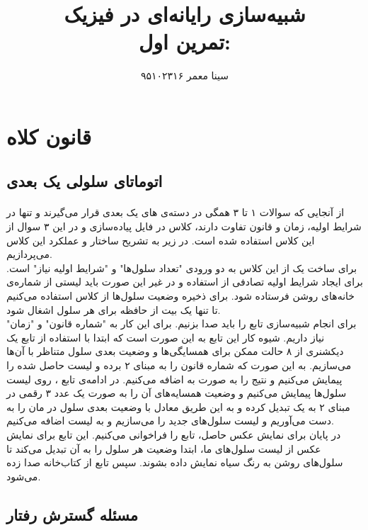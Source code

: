 \documentclass[11pt, a4paper]{article}
\title{\textbf{شبیه‌سازی رایانه‌ای در فیزیک}
    \\تمرین اول: \lr{Cellular Automata}}
\author{سینا معمر ۹۵۱۰۲۳۱۶}
\begin{document}
\maketitle
\thispagestyle{empty}


\section{\textbf{قانون کلاه}}
\subsection{اتوماتای سلولی یک بعدی}
\paragraph{}
از آنجایی که سوالات ۱ تا ۳ همگی در دسته‌ی  های یک بعدی قرار می‌گیرند و تنها در شرایط اولیه، زمان و قانون تفاوت دارند، کلاس  در فایل  پیاده‌سازی و در این ۳ سوال از این کلاس استفاده شده است. در زیر به تشریح ساختار و عملکرد این کلاس می‌پردازیم.\\
برای ساخت یک  از این کلاس به دو ورودی "تعداد سلول‌ها" و "شرایط اولیه نیاز" است. برای ایجاد شرایط اولیه تصادفی از  استفاده و در غیر این صورت باید لیستی از شماره‌ی خانه‌های روشن فرستاده شود. برای ذخیره وضعیت سلول‌ها از کلاس  استفاده می‌کنیم تا تنها یک بیت از حافظه برای هر سلول اشغال شود.\\
برای انجام شبیه‌سازی تابع  را باید صدا بزنیم. برای این کار به "شماره قانون" و "زمان" نیاز داریم. شیوه کار این تابع به این صورت است که ابتدا با استفاده از تابع  یک دیکشنری از ۸ حالت ممکن برای همسایگی‌ها و وضعیت بعدی سلول متناظر با آن‌ها می‌سازیم. به این صورت که شماره قانون را به مبنای ۲ برده و لیست حاصل شده را پیمایش می‌کنیم و نتیج را به صورت  به  اضافه می‌کنیم. در ادامه‌ی تابع ، روی لیست سلول‌ها پیمایش می‌کنیم و وضعیت همسایه‌های آن را به صورت یک عدد ۳ رقمی در مبنای ۲ به یک  تبدیل کرده و به این طریق  معادل با وضعیت بعدی سلول در  مان را به دست می‌آوریم و لیست سلول‌های جدید را می‌سازیم و به لیست  اضافه می‌کنیم.\\
در پایان برای نمایش عکس حاصل، تابع  را فراخوانی می‌کنیم. این تابع برای نمایش عکس از لیست سلول‌های ما، ابتدا وضعیت هر سلول را به  آن تبدیل می‌کند تا سلول‌های روشن به رنگ سیاه نمایش داده بشوند. سپس تابع  از کتاب‌خانه  صدا زده می‌شود.
\subsection{مسئله گسترش رفتار}
\end{document}
